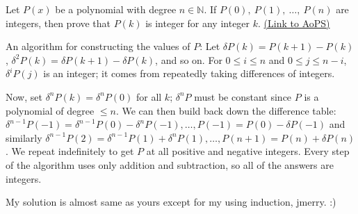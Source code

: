 \begin{problem}
	Let $P(x)$ be a polynomial with degree $ n\in{\mathbb{N}}$. If $ P(0),\ P(1),\ \ldots ,\ P(n)$ are integers, then prove that $ P(k)$ is integer for any integer $k$.
	\flushright \href{https://artofproblemsolving.com/community/c6h173485}{(Link to AoPS)}
\end{problem}



\begin{solution}
	An algorithm for constructing the values of $ P$:
Let $ \delta P(k)=P(k+1)-P(k)$, $ \delta^2 P(k)=\delta P(k+1)-\delta P(k)$, and so on. For $ 0\le i\le n$ and $ 0\le j\le n-i$, $ \delta^i P(j)$ is an integer; it comes from repeatedly taking differences of integers.

Now, set $ \delta^n P(k)=\delta^n P(0)$ for all $ k$; $ \delta^n P$ must be constant since $ P$ is a polynomial of degree $ \le n$. We can then build back down the difference table: $ \delta^{n-1}P(-1)=\delta^{n-1}P(0)-\delta^n P(-1),\dots,P(-1)=P(0)-\delta P(-1)$ and similarly $ \delta^{n-1}P(2)=\delta^{n-1}P(1)+\delta^n P(1),\dots,P(n+1)=P(n)+\delta P(n)$. We repeat indefinitely to get $ P$ at all positive and negative integers. Every step of the algorithm uses only addition and subtraction, so all of the answers are integers.
\end{solution}



\begin{solution}
	My solution is almost same as yours except for my using induction, jmerry. :)
\end{solution}



